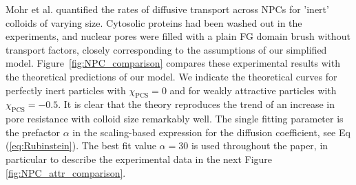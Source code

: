 \documentclass[12pt, a4paper]{article}
\begin{document}
Mohr et al. quantified the rates of diffusive transport across NPCs for 'inert' colloids of varying size. Cytosolic proteins had been washed out in the experiments, and nuclear pores were filled with a plain FG domain brush without transport factors, closely corresponding to the assumptions of our simplified model. Figure~\ref{fig:NPC_comparison} compares these experimental results with the theoretical predictions of our model. We indicate the theoretical curves for perfectly inert particles with $\chi_{\text{PCS}} = 0$ and for weakly attractive particles with $\chi_{\text{PCS}} = -0.5$. It is clear that the theory reproduces the trend of an increase in pore resistance with colloid size remarkably well. The single fitting parameter is the prefactor $\alpha$ in the scaling-based expression for the diffusion coefficient, see Eq (\ref{eq:Rubinstein}). The best fit value $\alpha=30$ is used throughout the paper, in particular to describe the experimental data in the next Figure \ref{fig:NPC_attr_comparison}.



\end{document}
